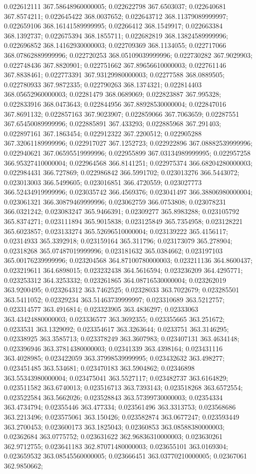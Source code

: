 0.022612111 367.58648960000005; 0.022622798 367.6503037; 0.022640681 367.8574211; 0.022645422 368.0037652; 0.022643712 368.11379089999997; 0.022659106 368.16141589999995; 0.02266412 368.1549917; 0.022663384 368.1392737; 0.022675394 368.1855711; 0.022682819 368.13824589999996; 0.022696852 368.14162930000003; 0.022709369 368.1134055; 0.022717066 368.07862889999996; 0.022720253 368.05109039999996; 0.022730282 367.9029903; 0.022748436 367.8820901; 0.022751662 367.89656610000003; 0.022761146 367.8838461; 0.022773391 367.93129980000003; 0.02277588 368.0889505; 0.022780933 367.9872335; 0.022790263 368.1374321; 0.022814403 368.05652960000003; 0.02281479 368.0689069; 0.022823887 367.995328; 0.022833916 368.0473643; 0.022844956 367.88928530000004; 0.022847016 367.8691132; 0.022857163 367.9023907; 0.022859066 367.7063659; 0.02287551 367.65450089999996; 0.022885891 367.433293; 0.022885968 367.291403; 0.022897161 367.1863454; 0.022912322 367.2200512; 0.022905288 367.32061189999996; 0.022917027 367.1252723; 0.022922896 367.08882539999996; 0.022940621 367.06595519999996; 0.022955899 367.03134989999995; 0.022957258 366.95327410000004; 0.022964568 366.8141251; 0.022975374 366.68204280000003; 0.022984431 366.727869; 0.022986842 366.5991702; 0.023013276 366.5443072; 0.023013003 366.5499605; 0.023016851 366.4720559; 0.023027773 366.52434919999996; 0.023035742 366.4569376; 0.023041497 366.38806980000004; 0.023061321 366.30879469999996; 0.023062759 366.0753808; 0.023078231 366.0321242; 0.023083247 365.9466391; 0.02309277 365.8983288; 0.023105792 365.8374271; 0.023111894 365.9015838; 0.023125849 365.7354958; 0.023128221 365.6023857; 0.023133274 365.52696510000004; 0.023139222 365.4156117; 0.02314933 365.3392918; 0.023159164 365.311796; 0.023173079 365.278904; 0.02318268 365.07487019999996; 0.023181632 365.0384662; 0.023197103 365.00176239999996; 0.023204568 364.87100780000003; 0.023211136 364.8600437; 0.023219611 364.6898015; 0.023232438 364.5616594; 0.023236209 364.4295771; 0.023253312 364.3253332; 0.023261865 364.08716530000004; 0.023262019 363.9200495; 0.023264312 363.7462525; 0.02328033 363.7022679; 0.023285501 363.5411052; 0.02329234 363.51463739999997; 0.023310689 363.5212757; 0.023314577 363.4916814; 0.023323905 363.4836297; 0.02333063 363.43424880000003; 0.023336577 363.3692355; 0.023355665 363.251672; 0.0233531 363.1329092; 0.023354617 363.3263644; 0.0233751 363.3146295; 0.02338925 363.3585713; 0.023378249 363.3607983; 0.023407131 363.4634148; 0.023396946 363.37814380000003; 0.02341339 363.4398164; 0.023431116 363.4028985; 0.023422059 363.37998539999995; 0.023432632 363.498277; 0.023451485 363.534681; 0.023470183 363.5904862; 0.02346898 363.55343980000004; 0.023475041 363.5527117; 0.023482737 363.6164829; 0.023511582 363.6740013; 0.023516713 363.7393143; 0.023518268 363.6572554; 0.023522584 363.5662026; 0.023528843 363.57399730000003; 0.02354334 363.4734794; 0.02355446 363.477334; 0.023561496 363.3313753; 0.023568686 363.2213496; 0.023575061 363.150426; 0.023582874 363.0677247; 0.023593449 363.2700453; 0.023600173 363.1825043; 0.02360853 363.08588380000003; 0.02362684 363.0775752; 0.023631622 362.96836310000003; 0.023630261 362.9712755; 0.023641183 362.87071480000003; 0.023655101 363.0169304; 0.023659532 363.08545560000005; 0.023666451 363.03770210000005; 0.02367061 362.9850662; 